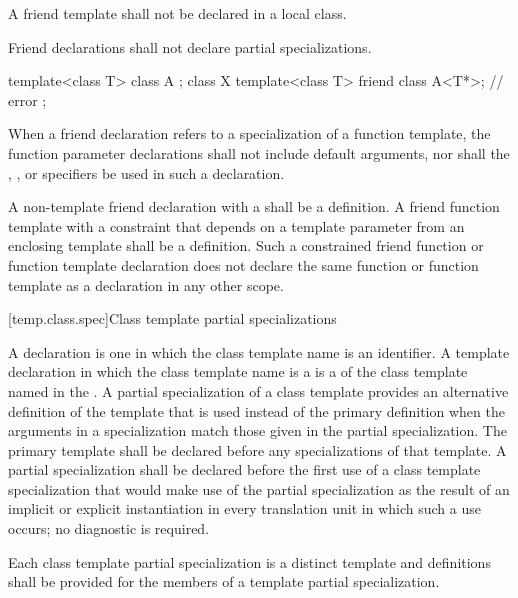 \pnum
A friend template shall not be declared in a local class.

\pnum
Friend declarations shall not declare partial specializations.
\begin{example}
\begin{codeblock}
template<class T> class A { };
class X {
  template<class T> friend class A<T*>;         // error
};
\end{codeblock}
\end{example}

\pnum
When a friend declaration refers to a specialization of a function
template, the function parameter declarations shall not include
default arguments, nor shall
the , , or  specifiers
be used in such a declaration.

\pnum
A non-template friend declaration
with a 
shall be a definition.
A friend function template
with a constraint that depends on a template parameter from an enclosing template
shall be a definition.
Such a constrained friend function or function template declaration
does not declare the same function or function template as a declaration in any other scope.

[temp.class.spec]{Class template partial specializations}

\pnum
{}%
%
A
declaration is one in which the class template name is an
identifier.
A template declaration in which the class template name is a
is a
of the class template named in the
.
A partial specialization of a class template provides an alternative definition
of the template that is used instead of the primary definition when the
arguments in a specialization match those given in the partial
specialization.
The primary template shall be declared before any specializations of
that template.
A partial specialization shall be declared before the first use of a class template
specialization that would make use of the partial specialization as the result of
an implicit or explicit instantiation in every translation unit in which such a use
occurs; no diagnostic is required.

\pnum
Each class template partial specialization is a distinct template and
definitions shall be provided for the members of a template partial
specialization.


